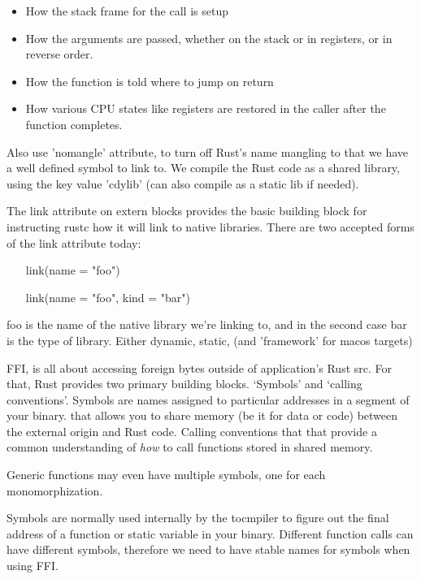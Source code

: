 \documentclass[12pt, a4, twoside]{article}
\begin{document}
\begin{itemize}
    \item How the stack frame for the call is setup
    \item How the arguments are passed, whether on the stack or in registers, or in reverse order.
    \item How the function is told where to jump on return
    \item How various CPU states like registers are restored in the caller after the function completes.
\end{itemize}

Also use 'nomangle' attribute, to turn off Rust's name mangling to that we have a well defined symbol to link to. We compile the Rust code as a shared library, using the key value 'cdylib' (can also compile as a static lib if needed).


The link attribute on extern blocks provides the basic building block for instructing rustc how it will link to native libraries. There are two accepted forms of the link attribute today:

\begin{itemize}
    \item [link(name = "foo")]
    \item [link(name = "foo", kind = "bar")]
\end{itemize}

foo is the name of the native library we're linking to, and in the second case bar is the type of library. Either dynamic, static, (and 'framework' for macos targets)

FFI, is all about accessing foreign bytes outside of application's Rust src. For that, Rust provides two primary building blocks. `Symbols' and `calling conventions'. Symbols are names assigned to particular addresses in a segment of your binary. that allows you to share memory (be it for data or code) between the external origin and Rust code. Calling conventions that that provide a common understanding of \textit{how} to call functions stored in shared memory.

Generic functions may even have multiple symbols, one for each monomorphization.

Symbols are normally used internally by the tocmpiler to figure out the final address of a function or static variable in your binary. Different function calls can have different symbols, therefore we need to have stable names for symbols when using FFI.
\end{document}
